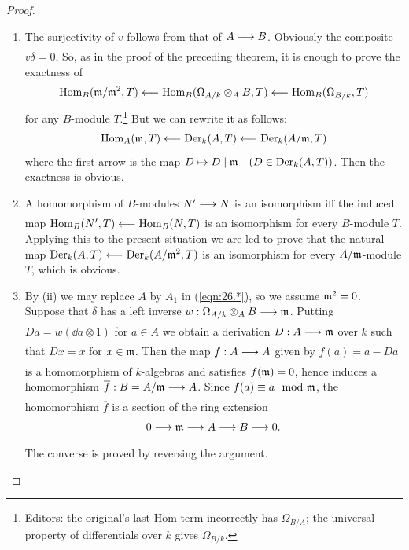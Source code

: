 \documentclass[../main]{subfiles}
\begin{document}
\begin{proof}
\begin{enumerate}
    \item The surjectivity of $v$ follows from that of $A \varrightarrow{} B$. Obviously the composite $v \delta=0$, So, as in the proof of the preceding theorem, it is enough to prove the exactness of \[\operatorname{Hom}_B(\mathfrak{m}/\mathfrak{m}^2, T)\longleftarrow\operatorname{Hom}_B(\Omega_{A / k} \otimes_A B, T)\longleftarrow\operatorname{Hom}_B(\Omega_{B / k}, T)\] for any $B$-module $T$.\footnote{Editors: the original's last Hom term incorrectly has $\Omega_{B/A}$; the universal property of differentials over $k$ gives $\Omega_{B/k}$.} But we can rewrite it as follows: \[\operatorname{Hom}_A(\mathfrak{m}, T)\longleftarrow\operatorname{Der}_k(A, T)\longleftarrow\operatorname{Der}_k(A / \mathfrak{m}, T)\] where the first arrow is the map $D \mapsto D \mid \ideal{m} \for{D\in \Der_k(A, T)}$. Then the exactness is obvious.

    \item A homomorphism of $B$-modules $N' \varrightarrow{} N$ is an isomorphism iff the induced map $\operatorname{Hom}_B(N', T) \longleftarrow \operatorname{Hom}_B(N, T)$ is an isomorphism for every $B$-module $T$. Applying this to the present situation we are led to prove that the natural map $\operatorname{Der}_k(A, T)\longleftarrow \operatorname{Der}_k(A / \mathfrak{m}^2,T)$ is an isomorphism for every $A/\mathfrak{m}$-module $T$, which is obvious.

    \item By (ii) we may replace $A$ by $A_1$ in (\ref{eqn:26.*}), so we assume $\mathfrak{m}^2=0$. Suppose that $\delta$ has a left inverse $w: \Omega_{A / k} \otimes_A B \varrightarrow{} \ideal{m}$. Putting $Da =w(\dd a \otimes 1)$ for $a\in A$ we obtain a derivation $D: A\varrightarrow{} \ideal{m}$ over $k$ such that $D x=x$ for $x \in \mathfrak{m}$. Then the map $f: A \varrightarrow{} A$ given by $f(a)=a-Da$ is a homomorphism of $k$-algebras and satisfies $f(\mathfrak{m})=0$, hence induces a homomorphism $\overline{f}: B=A / \ideal{m}\varrightarrow{}A$. Since $f(a) \equiv a \mod \ideal{m}$, the homomorphism $\overline{f}$ is a section of the ring extension \[0 \varrightarrow{} \ideal{m} \varrightarrow{} A \varrightarrow{} B \varrightarrow{} 0.\] The converse is proved by reversing the argument.
\end{enumerate}
\end{proof}
\end{document}
